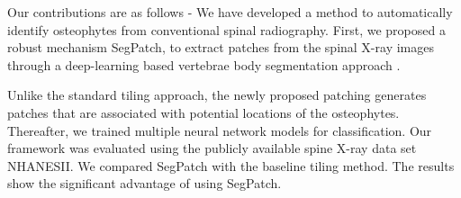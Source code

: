 \documentclass{article}
\begin{document}
Our contributions are as follows - We have developed a method to automatically identify osteophytes from conventional spinal radiography. First, we proposed a robust mechanism SegPatch, to extract patches from the spinal X-ray images through a deep-learning based vertebrae body segmentation approach \cite{chen2023vertxnet}.

Unlike the standard tiling approach, the newly proposed patching generates patches that are associated with potential locations of the osteophytes. Thereafter, we trained multiple neural network models for classification. 
Our framework was evaluated using the publicly available spine X-ray data set NHANESII. We compared SegPatch with the baseline tiling method. The results show the significant advantage of using SegPatch.



\end{document}

